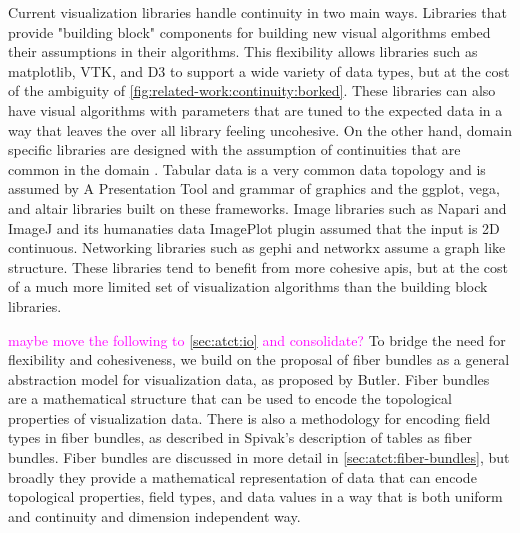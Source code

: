 \documentclass[10pt,journal,compsoc]{IEEEtran}
\newcommand{\note}[1]{\textcolor{magenta}{#1}}
\theoremstyle{definition}
\theoremstyle{remark}
\begin{document}
Current visualization libraries handle continuity in two main ways. Libraries that provide "building block" \cite{wongsuphasawatNavigatingWideWorld2021} components for building new visual algorithms embed their assumptions in their algorithms. This flexibility allows libraries such as matplotlib\cite{hunterMatplotlib2DGraphics2007}, VTK\cite{hanwellVisualizationToolkitVTK2015,geveciVTK2012}, and D3\cite{bostockDataDrivenDocuments2011} to support a wide variety of data types, but at the cost of the ambiguity of \autoref{fig:related-work:continuity:borked}. These libraries can also have visual algorithms with  parameters that are tuned to the expected data in a way that leaves the over all library feeling uncohesive. On the other hand, domain specific libraries are designed with the assumption of continuities that are common in the domain \cite{HeerSoftware2006}. Tabular data is a very common data topology and is assumed by 
A Presentation Tool\cite{mackinlayAutomatingDesignGraphical1986, mackinlayAutomatingDesignGraphical1986} and grammar of graphics\cite{wilkinsonGrammarGraphics2005} and the ggplot\cite{wickhamGgplot2ElegantGraphics2016a}, vega\cite{satyanarayanDeclarativeInteractionDesign2014}, and altair\cite{vanderplasAltairInteractiveStatistical2018} libraries built on these frameworks. Image libraries such as Napari\cite{nicholas_sofroniew_2021_4533308} and ImageJ\cite{schneiderNIHImageImageJ2012} and its humanaties data ImagePlot\cite{studiesCulturevisImageplot2021} plugin assumed that the input is 2D continuous. Networking libraries such as gephi\cite{bastianGephiOpenSource2009} and networkx\cite{HagbergExploringNetwork2008} assume a graph like structure. These libraries tend to benefit from more cohesive apis, but at the cost of a much more limited set of visualization algorithms than the building block libraries. 

\note{maybe move the following to \autoref{sec:atct:io} and consolidate?}
To bridge the need for flexibility and cohesiveness, we build on the proposal of fiber bundles as a general abstraction model for visualization data, as proposed by Butler\cite{butlerVectorBundleClassesForm1992,butlerVisualizationModelBased1989}. Fiber bundles are a mathematical structure that can be used to encode the topological properties of visualization data. There is also a methodology for encoding field types in fiber bundles, as described in Spivak's description of tables as fiber bundles\cite{spivakSIMPLICIALDATABASES}. Fiber bundles are discussed in more detail in \autoref{sec:atct:fiber-bundles}, but broadly they provide a mathematical representation of data that can encode topological properties, field types, and data values in a way that is both uniform and continuity and dimension independent way. 
\end{document}
